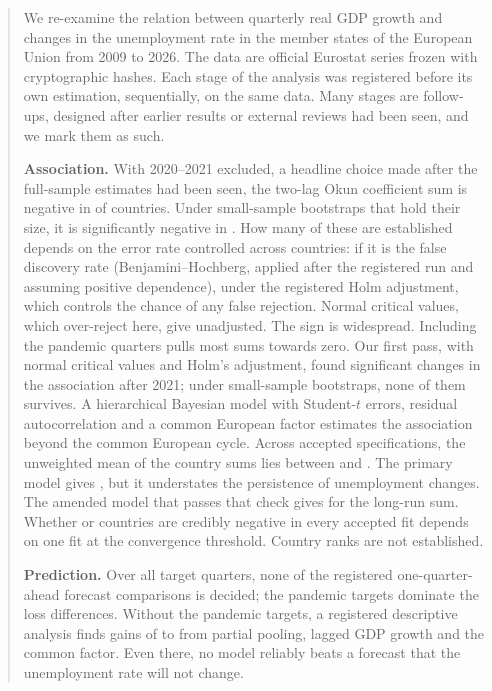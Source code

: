 \begin{abstract}
\noindent
We re-examine the relation between quarterly real GDP growth and changes in the
unemployment rate in the  member states of the European Union from 2009
to 2026. The data are official Eurostat series frozen with cryptographic hashes. Each
stage of the analysis was registered before its own estimation, sequentially, on the same
data. Many stages are follow-ups, designed after earlier results or external reviews had
been seen, and we mark them as such.

\textbf{Association.} With 2020--2021 excluded, a headline choice made after the
full-sample estimates had been seen, the two-lag Okun coefficient sum is
negative in  of  countries. Under small-sample
bootstraps that hold their size, it is significantly negative in . How
many of these are established depends on the error rate controlled across countries:
 if it is the false discovery rate (Benjamini--Hochberg, applied after the
registered run and assuming positive dependence),  under the
registered Holm adjustment, which controls the chance of any false rejection. Normal
critical values, which over-reject here, give  unadjusted. The
sign is widespread. Including the pandemic
quarters pulls most sums towards zero. Our first pass, with normal critical values and
Holm's adjustment, found  significant changes in the association
after 2021; under small-sample bootstraps, none of them survives. A hierarchical Bayesian model with Student-$t$
errors, residual autocorrelation and a common European factor estimates the association
beyond the common European cycle. Across accepted specifications, the unweighted mean of
the country sums lies between  and . The primary model
gives  , but it understates the persistence of unemployment
changes. The amended model that passes that check gives   for
the long-run sum. Whether  or  countries are
credibly negative in every accepted fit depends on one fit at the convergence threshold.
Country ranks are not established.

\textbf{Prediction.} Over all  target quarters, none of the registered
one-quarter-ahead forecast comparisons is decided; the pandemic targets dominate the
loss differences. Without the pandemic targets, a registered descriptive analysis finds
gains of  to  from partial pooling, lagged GDP growth
and the common factor. Even there, no model reliably beats a forecast that the
unemployment rate will not change.


\end{abstract}
